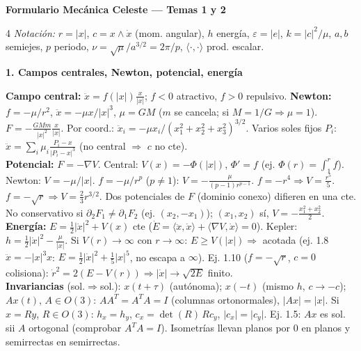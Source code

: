 \documentclass[8pt,a4paper,landscape]{extarticle}
\newcommand{\ip}[2]{\langle #1,#2\rangle}
\newcommand{\ab}[1]{\lvert #1\rvert}
\newcommand{\wg}{\wedge}
\newcommand{\xd}{\dot x}
\newcommand{\xdd}{\ddot x}
\newcommand{\seccion}[1]{\par\vspace{1.5pt}\noindent\colorbox{blue!12}{\parbox{\dimexpr\linewidth-2\fboxsep\relax}{\textbf{\textcolor{NavyBlue}{#1}}}}\par\vspace{0.5pt}}
\begin{document}
\footnotesize
\sloppy
\begin{center}
    {\bfseries\color{NavyBlue}\Large Formulario Mecánica Celeste --- Temas 1 y 2}\\
\end{center}

\begin{multicols}{4}
\textit{Notación:} $r=\ab x$, $c=x\wg\xd$ (mom. angular), $h$ energía, $\varepsilon=\ab e$, $k=\ab c^2/\mu$, $a,b$ semiejes, $p$ periodo, $\nu=\sqrt\mu/a^{3/2}=2\pi/p$, $\ip{\cdot}{\cdot}$ prod. escalar.

\seccion{1. Campos centrales, Newton, potencial, energía}
\textbf{Campo central:} $\xdd=f(\ab x)\frac{x}{\ab x}$; $f<0$ atractivo, $f>0$ repulsivo.
\textbf{Newton:} $f=-\mu/r^2$, $\xdd=-\mu x/\ab x^3$, $\mu=GM$ ($m$ se cancela; si $M=1/G\Rightarrow\mu=1$). $F=-\frac{GMm}{\ab x^2}\frac{x}{\ab x}$. Por coord.: $\ddot x_i=-\mu x_i/(x_1^2+x_2^2+x_3^2)^{3/2}$.
Varios soles fijos $P_i$: $\xdd=\sum_i\mu_i\frac{P_i-x}{\ab{P_i-x}^3}$ (no central $\Rightarrow$ $c$ no cte).\\
\textbf{Potencial:} $F=-\nabla V$. Central: $V(x)=-\Phi(\ab x)$, $\Phi'=f$ (ej. $\Phi(r)=\int_1^rf$). Newton: $V=-\mu/\ab x$. $f=-\mu/r^p$ ($p\ne1$): $V=-\frac{\mu}{(p-1)r^{p-1}}$. $f=-r^4\Rightarrow V=\frac{r^5}{5}$. $f=-\sqrt r\Rightarrow V=\frac23r^{3/2}$. Dos potenciales de $F$ (dominio conexo) difieren en una cte. No conservativo si $\partial_2F_1\neq\partial_1F_2$ (ej. $(x_2,-x_1)$); $(x_1,x_2)$ sí, $V=-\frac{x_1^2+x_2^2}{2}$.\\
\textbf{Energía:} $E=\frac12\ab\xd^2+V(x)$ cte ($\dot E=\ip{\xdd}{\xd}+\ip{\nabla V}{\xd}=0$). Kepler: $h=\frac12\ab\xd^2-\frac{\mu}{\ab x}$.
Si $V(r)\to\infty$ con $r\to\infty$: $E\ge V(\ab x)\Rightarrow$ acotada (ej. 1.8 $\xdd=-\ab x^3x$: $E=\frac12\ab\xd^2+\frac15\ab x^5$, no escapa a $\infty$).
Ej. 1.10 ($f=-\sqrt r$, $c=0$ colisiona): $\dot r^2=2(E-V(r))\Rightarrow\ab\xd\to\sqrt{2E}$ finito.\\
\textbf{Invariancias} (sol.$\Rightarrow$sol.): $x(t+\tau)$ (autónoma); $x(-t)$ (mismo $h$, $c\to-c$); $Ax(t)$, $A\in O(3)$: $AA^T=A^TA=I$ (columnas ortonormales), $\ab{Ax}=\ab x$. Si $x=Ry$, $R\in O(3)$: $h_x=h_y$, $c_x=\det(R)\,Rc_y$, $\ab{c_x}=\ab{c_y}$. Ej. 1.5: $Ax$ es sol. sii $A$ ortogonal (comprobar $A^TA=I$). Isometrías llevan planos por 0 en planos y semirrectas en semirrectas.


\end{multicols}
\end{document}
